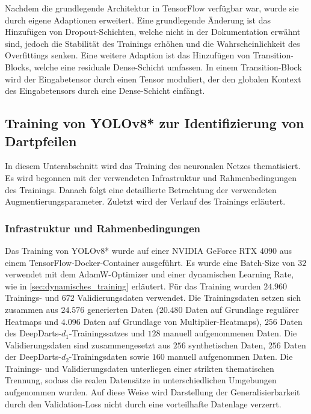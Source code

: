 Nachdem die grundlegende Architektur in TensorFlow verfügbar war, wurde sie durch eigene Adaptionen erweitert. Eine grundlegende Änderung ist das Hinzufügen von Dropout-Schichten, welche nicht in der Dokumentation erwähnt sind, jedoch die Stabilität des Trainings erhöhen und die Wahrscheinlichkeit des Overfittings senken. Eine weitere Adaption ist das Hinzufügen von Transition-Blocks, welche eine residuale Dense-Schicht umfassen. In einem Transition-Block wird der Eingabetensor durch einen Tensor moduliert, der den globalen Kontext des Eingabetensors durch eine Dense-Schicht einfängt.


\subsection{Training von YOLOv8* zur Identifizierung von Dartpfeilen}
\label{sec:training}

In diesem Unterabschnitt wird das Training des neuronalen Netzes thematisiert. Es wird begonnen mit der verwendeten Infrastruktur und Rahmenbedingungen des Trainings. Danach folgt eine detaillierte Betrachtung der verwendeten Augmentierungsparameter. Zuletzt wird der Verlauf des Trainings erläutert.

\subsubsection{Infrastruktur und Rahmenbedingungen}

Das Training von YOLOv8* wurde auf einer NVIDIA GeForce RTX 4090 aus einem TensorFlow-Docker-Container ausgeführt. Es wurde eine Batch-Size von $32$ verwendet mit dem AdamW-Optimizer und einer dynamischen Learning Rate, wie in \autoref{sec:dynamisches_training} erläutert. Für das Training wurden $24.960$ Trainings- und $672$ Validierungsdaten verwendet. Die Trainingsdaten setzen sich zusammen aus $24.576$ generierten Daten ($20.480$ Daten auf Grundlage regulärer Heatmaps und $4.096$ Daten auf Grundlage von Multiplier-Heatmaps), $256$ Daten des DeepDarts-$d_1$-Trainingssatzes und $128$ manuell aufgenommenen Daten. Die Validierungsdaten sind zusammengesetzt aus $256$ synthetischen Daten, $256$ Daten der DeepDarts-$d_2$-Trainingsdaten sowie $160$ manuell aufgenommen Daten. Die Trainings- und Validierungsdaten unterliegen einer strikten thematischen Trennung, sodass die realen Datensätze in unterschiedlichen Umgebungen aufgenommen wurden. Auf diese Weise wird Darstellung der Generalisierbarkeit durch den Validation-Loss nicht durch eine vorteilhafte Datenlage verzerrt.

